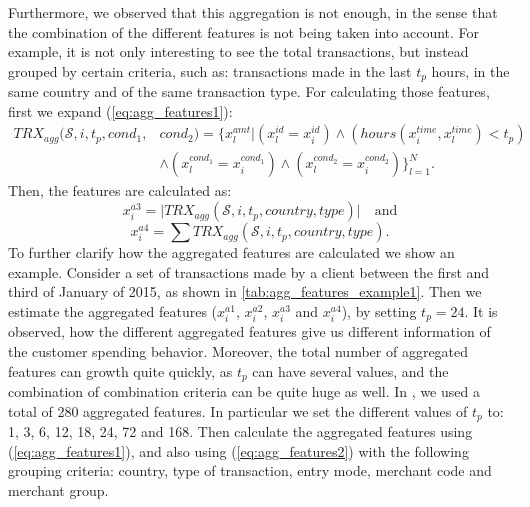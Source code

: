 	Furthermore, we observed that this aggregation is not enough, in the sense that the combination 
	of 	the different features is not being taken into account. For example, it is not only 
	interesting 	to see the total transactions, but instead grouped by 	certain criteria, such as: 
	transactions 	made in the last $t_p$ hours, in the same country 	and of the same transaction 
	type. For 	calculating those features, first we expand (\ref{eq:agg_features1}):
	\begin{align}\label{eq:agg_features2}
		TRX_{agg}(\mathcal{S},i, t_p, cond_1, & cond_2) = \bigg\{ x_l^{amt} \bigg\vert   
		\left(x_l^{id}=x_i^{id}\right) \wedge  \left(hours(x_i^{time},x_l^{time})< t_p\right) \nonumber 
		\\ 	&  \wedge \left(x_l^{cond_1} = x_i^{cond_1}\right) \wedge	\left(x_l^{cond_2} = 
		x_i^{cond_2}\right) \bigg\}_{l=1}^N.
		\end{align}
	Then, the features are calculated as:
	\[ x_i^{a3} = \vert TRX_{agg}(\mathcal{S},i, t_p, country, type) \vert \quad \text{and} \]
	\[  x_i^{a4} = \sum 	TRX_{agg}(\mathcal{S},i, t_p,country, type).	\]		
	To further clarify how the aggregated features are calculated we show an example. Consider a set 
	of transactions made by a client between the first and third of January of 2015, as shown in 
	\tablename{ 	\ref{tab:agg_features_example1}}. Then we estimate the aggregated features 
	($x_i^{a1}$, $x_i^{a2}$, $x_i^{a3}$ and $x_i^{a4}$), by setting $t_p=24$. It is observed, how the 
	different aggregated features give us different information of the customer spending behavior.
	Moreover, the total number of aggregated features can growth quite quickly, as $t_p$ can have 
	several values, and the combination of combination criteria can be quite huge as well.
	In \cite{CorreaBahnsen2013}, we used a total of 280 aggregated features. In particular we set the 
	different values of $t_p$ to: 1, 3, 6, 12, 18, 24, 72 and 168. Then calculate the aggregated 
	features 	using (\ref{eq:agg_features1}), and also using (\ref{eq:agg_features2}) with the 
	following  grouping criteria:	country, type of transaction, entry mode, merchant code and 
merchant 
group. 
		

